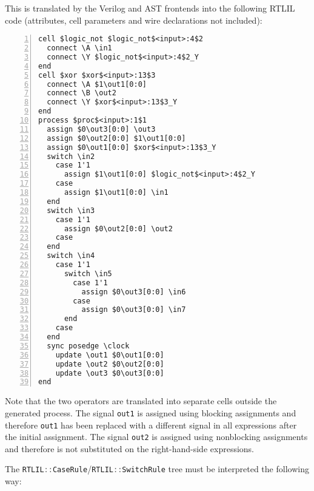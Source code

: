 This is translated by the Verilog and AST frontends into the following RTLIL code (attributes, cell parameters
and wire declarations not included):

\begin{lstlisting}[numbers=left,frame=single,language=rtlil]
cell $logic_not $logic_not$<input>:4$2
  connect \A \in1
  connect \Y $logic_not$<input>:4$2_Y
end
cell $xor $xor$<input>:13$3
  connect \A $1\out1[0:0]
  connect \B \out2
  connect \Y $xor$<input>:13$3_Y
end
process $proc$<input>:1$1
  assign $0\out3[0:0] \out3
  assign $0\out2[0:0] $1\out1[0:0]
  assign $0\out1[0:0] $xor$<input>:13$3_Y
  switch \in2
    case 1'1
      assign $1\out1[0:0] $logic_not$<input>:4$2_Y
    case 
      assign $1\out1[0:0] \in1
  end
  switch \in3
    case 1'1
      assign $0\out2[0:0] \out2
    case 
  end
  switch \in4
    case 1'1
      switch \in5
        case 1'1
          assign $0\out3[0:0] \in6
        case 
          assign $0\out3[0:0] \in7
      end
    case 
  end
  sync posedge \clock
    update \out1 $0\out1[0:0]
    update \out2 $0\out2[0:0]
    update \out3 $0\out3[0:0]
end
\end{lstlisting}

Note that the two operators are translated into separate cells outside the generated process. The signal
\lstinline[language=Verilog]{out1} is assigned using blocking assignments and therefore \lstinline[language=Verilog]{out1}
has been replaced with a different signal in all expressions after the initial assignment. The signal
\lstinline[language=Verilog]{out2} is assigned using nonblocking assignments and therefore is not substituted
on the right-hand-side expressions.

The \lstinline[language=C++]{RTLIL::CaseRule}/\lstinline[language=C++]{RTLIL::SwitchRule}
tree must be interpreted the following way:

